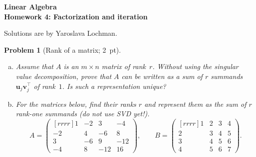 \documentclass[12pt,a4]{article}
\newtheorem{problem}{Problem}
\newcommand{\bu}{{\mathbf u}}
\newcommand{\bv}{{\mathbf v}}
\begin{document}
	
\begin{center}
	\Large\bf{Linear Algebra\\
		Homework 4: Factorization and iteration}
\end{center}
Solutions are by Yaroslava Lochman.
	

\begin{problem}[Rank of a matrix; 2~pt]\label{prb:4.1}\rm
\begin{enumerate}[(a)]
	\item Assume that $A$ is an $m\times n$ matrix of rank~$r$. Without using the  singular value decomposition, prove that $A$ can be written as a sum of $r$ summands $\bu_j\bv_j^\top$  of rank~$1$. Is such a representation unique?
	\item For the matrices below, find their ranks $r$ and represent them as the sum of $r$ rank-one summands (do not use SVD yet!).
\[
    A =
    \begin{pmatrix}[rrrr]
        1 & -2 & 3 & -4 \\
        -2 & 4 & -6 & 8 \\
        3 & -6 & 9 & -12 \\
        -4 & 8 & -12 & 16
    \end{pmatrix}, 
    \qquad
        B =
    \begin{pmatrix}[rrrr]
        1 & 2 & 3 & 4 \\
        2 & 3 & 4 & 5 \\
        3 & 4 & 5 & 6 \\
        4 & 5 & 6 & 7
    \end{pmatrix}.
\]
\end{enumerate}	
\end{problem}
\end{document}

